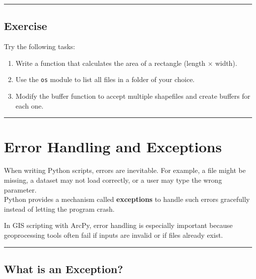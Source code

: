 \documentclass[
  11pt,
  letterpaper,
]{book}
\providecommand{\tightlist}{%
  \setlength{\itemsep}{0pt}\setlength{\parskip}{0pt}}
\begin{document}
\begin{center}\rule{0.5\linewidth}{0.5pt}\end{center}

\section{Exercise}\label{exercise-3}

Try the following tasks:

\begin{enumerate}
\def\labelenumi{\arabic{enumi}.}
\tightlist
\item
  Write a function that calculates the area of a rectangle (length ×
  width).\\
\item
  Use the \texttt{os} module to list all files in a folder of your
  choice.\\
\item
  Modify the buffer function to accept multiple shapefiles and create
  buffers for each one.
\end{enumerate}

\begin{center}\rule{0.5\linewidth}{0.5pt}\end{center}

\chapter{Error Handling and
Exceptions}\label{error-handling-and-exceptions}

When writing Python scripts, errors are inevitable. For example, a file
might be missing, a dataset may not load correctly, or a user may type
the wrong parameter.\\
Python provides a mechanism called \textbf{exceptions} to handle such
errors gracefully instead of letting the program crash.

In GIS scripting with ArcPy, error handling is especially important
because geoprocessing tools often fail if inputs are invalid or if files
already exist.

\begin{center}\rule{0.5\linewidth}{0.5pt}\end{center}

\section{What is an Exception?}\label{what-is-an-exception}
\end{document}
